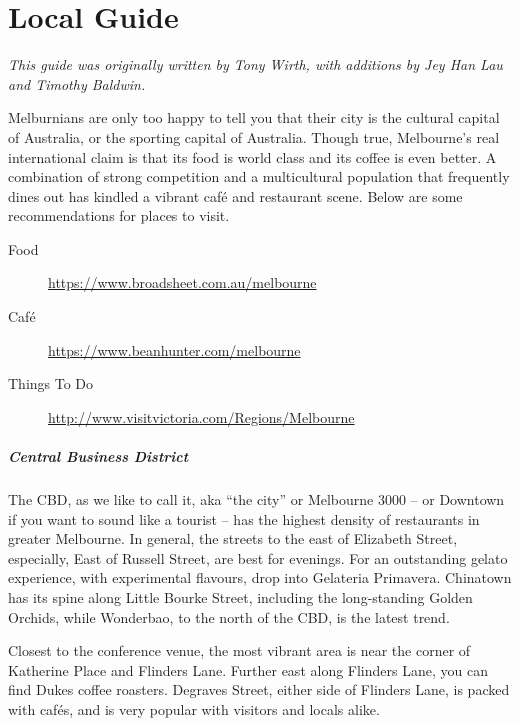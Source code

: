 \chapter{Local Guide}
\thispagestyle{emptyheader}

\emph{This guide was originally written by Tony Wirth, with additions by 
  Jey Han Lau and Timothy Baldwin.}

Melburnians are only too happy to tell you that their city is the cultural
capital of Australia, or the sporting capital of Australia.
Though true, Melbourne's real international claim is that its food is 
world class and its coffee is even better.
A combination of strong competition and a multicultural
population that frequently dines out
has kindled a vibrant caf{\'e} and restaurant scene.
Below are some recommendations for places to visit.

\begin{description}
\item[Food] \url{https://www.broadsheet.com.au/melbourne}
\item[Caf{\'e}] \url{https://www.beanhunter.com/melbourne}
\item[Things To Do] \url{http://www.visitvictoria.com/Regions/Melbourne}
\end{description}



\paragraph{Central Business District}

The CBD, as we like to call it, aka ``the city'' or Melbourne 3000 -- or
Downtown if you want to sound like a tourist -- has the highest density
of restaurants in greater Melbourne. In general, the streets to the east
of Elizabeth Street, especially, East of Russell Street, are best for
evenings.  For an outstanding gelato experience, with experimental
flavours, drop into Gelateria Primavera. Chinatown has its spine along
Little Bourke Street, including the long-standing Golden Orchids, while
Wonderbao, to the north of the CBD, is the latest trend.

Closest to the conference venue,
the most vibrant area
is near the corner of
Katherine Place and Flinders Lane.
Further east along Flinders Lane,
you can find Dukes coffee roasters.
Degraves Street, either side of Flinders Lane, is packed with caf{\'e}s,
and is very popular with visitors and locals alike.

